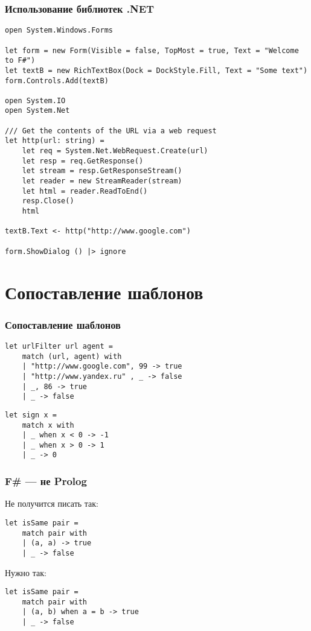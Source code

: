 \documentclass{../../slides-style}
\begin{document}
    \begin{frame}[fragile]
        \frametitle{Использование библиотек .NET}
        \begin{scriptsize}
            \begin{verbatim}
open System.Windows.Forms

let form = new Form(Visible = false, TopMost = true, Text = "Welcome to F#")
let textB = new RichTextBox(Dock = DockStyle.Fill, Text = "Some text")
form.Controls.Add(textB)

open System.IO
open System.Net

/// Get the contents of the URL via a web request
let http(url: string) =
    let req = System.Net.WebRequest.Create(url)
    let resp = req.GetResponse()
    let stream = resp.GetResponseStream()
    let reader = new StreamReader(stream)
    let html = reader.ReadToEnd()
    resp.Close()
    html

textB.Text <- http("http://www.google.com")

form.ShowDialog () |> ignore
            \end{verbatim}
        \end{scriptsize}
    \end{frame}

    \section{Сопоставление шаблонов}
    
    \begin{frame}[fragile]
        \frametitle{Сопоставление шаблонов}
        \begin{verbatim}
let urlFilter url agent =
    match (url, agent) with
    | "http://www.google.com", 99 -> true
    | "http://www.yandex.ru" , _ -> false
    | _, 86 -> true
    | _ -> false
        \end{verbatim}

        \begin{verbatim}
let sign x =
    match x with
    | _ when x < 0 -> -1
    | _ when x > 0 -> 1
    | _ -> 0
        \end{verbatim}
    \end{frame}

    \begin{frame}[fragile]
        \frametitle{F\# --- не Prolog}
        Не получится писать так:
        \begin{verbatim}
let isSame pair =
    match pair with
    | (a, a) -> true
    | _ -> false
        \end{verbatim}
        Нужно так:
        \begin{verbatim}
let isSame pair =
    match pair with
    | (a, b) when a = b -> true
    | _ -> false
        \end{verbatim}
    \end{frame}
\end{document}

